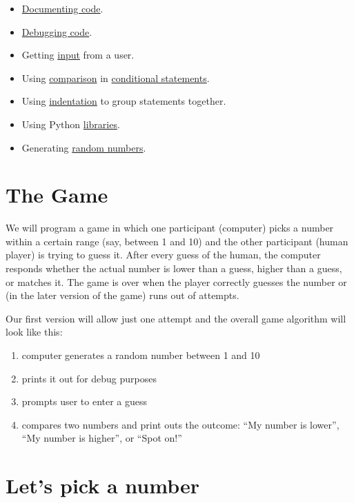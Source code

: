 \documentclass[
]{book}
\providecommand{\tightlist}{%
  \setlength{\itemsep}{0pt}\setlength{\parskip}{0pt}}
\begin{document}
\begin{itemize}
\tightlist
\item
  \protect\hyperlink{documenting-your-code}{Documenting code}.
\item
  \protect\hyperlink{debugging}{Debugging code}.
\item
  Getting \protect\hyperlink{input-function}{input} from a user.
\item
  Using \protect\hyperlink{comparisons}{comparison} in \protect\hyperlink{if-statement}{conditional statements}.
\item
  Using \protect\hyperlink{indentation}{indentation} to group statements together.
\item
  Using Python \protect\hyperlink{using-libraries}{libraries}.
\item
  Generating \protect\hyperlink{picking-a-number-randomly}{random numbers}.
\end{itemize}

\hypertarget{the-game}{%
\section{The Game}\label{the-game}}

We will program a game in which one participant (computer) picks a number within a certain range (say, between 1 and 10) and the other participant (human player) is trying to guess it. After every guess of the human, the computer responds whether the actual number is lower than a guess, higher than a guess, or matches it. The game is over when the player correctly guesses the number or (in the later version of the game) runs out of attempts.

Our first version will allow just one attempt and the overall game algorithm will look like this:

\begin{enumerate}
\def\labelenumi{\arabic{enumi}.}
\tightlist
\item
  computer generates a random number between 1 and 10
\item
  prints it out for debug purposes
\item
  prompts user to enter a guess
\item
  compares two numbers and print outs the outcome: ``My number is lower'', ``My number is higher'', or ``Spot on!''
\end{enumerate}

\hypertarget{lets-pick-a-number}{%
\section{Let's pick a number}\label{lets-pick-a-number}}
\end{document}
